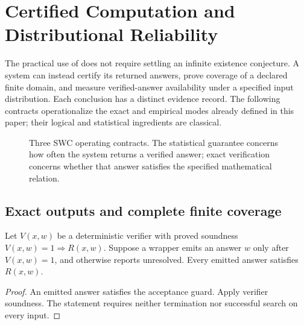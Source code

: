 \section{Certified Computation and Distributional Reliability}\label{sec:assurance}

The practical use of \SWC{} does not require settling an infinite existence
conjecture.  A system can instead certify its returned answers, prove coverage
of a declared finite domain, and measure verified-answer availability under a
specified input distribution.  Each conclusion has a distinct evidence record.
The following contracts operationalize the exact and empirical modes already
defined in this paper; their logical and statistical ingredients are classical.

\begin{figure}[htbp]
\centering
{}
\caption{Three SWC operating contracts. The statistical guarantee concerns how
often the system returns a verified answer; exact verification concerns whether
that answer satisfies the specified mathematical relation.}
\label{fig:operating-contracts}
\end{figure}

\subsection{Exact outputs and complete finite coverage}

\begin{theorem}\label{thm:output-contract}
Let $V(x,w)$ be a deterministic verifier with proved soundness
$V(x,w)=1\Rightarrow R(x,w)$. Suppose a wrapper emits an answer $w$ only after
$V(x,w)=1$, and otherwise reports unresolved. Every emitted answer satisfies
$R(x,w)$.
\end{theorem}
\begin{proof}
An emitted answer satisfies the acceptance guard. Apply verifier soundness.
The statement requires neither termination nor successful search on every input.
\end{proof}

